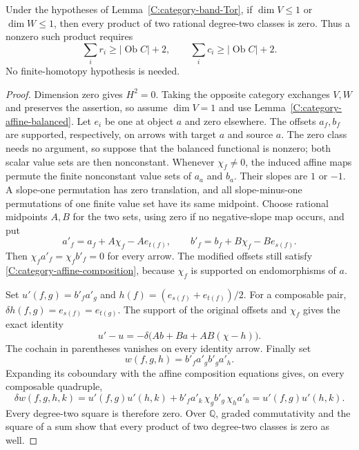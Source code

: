 \begin{proposition}
\label{C:category-rank-one-cups}
Under the hypotheses of Lemma~\ref{C:category-band-Tor}, if
$\dim V\leq1$ or $\dim W\leq1$, then every product of two
rational degree-two classes is zero.  Thus a nonzero such product
requires
\[
 \sum_i r_i\geq |\operatorname{Ob}C|+2,
 \qquad
 \sum_i c_i\geq |\operatorname{Ob}C|+2.
\]
No finite-homotopy hypothesis is needed.
\end{proposition}
\begin{proof}
Dimension zero gives $H^2=0$.  Taking the opposite category
exchanges $V,W$ and preserves the assertion, so assume $\dim V=1$
and use Lemma~\ref{C:category-affine-balanced}.  Let $e_i$ be one
at object $a$ and zero elsewhere.  The offsets $a_f,b_f$ are
supported, respectively, on arrows with target $a$ and source $a$.
The zero class needs no argument, so suppose that the balanced
functional is nonzero; both scalar value sets are then nonconstant.
Whenever $\chi_f\ne0$, the induced affine maps permute the finite
nonconstant value sets of $a_a$ and $b_a$.  Their slopes are
$1$ or $-1$.  A slope-one permutation has zero translation, and
all slope-minus-one permutations of one finite value set have
its same midpoint.  Choose rational midpoints $A,B$ for the two
sets, using zero if no negative-slope map occurs, and put
\[
 a'_f=a_f+A\chi_f-Ae_{t(f)},\qquad
 b'_f=b_f+B\chi_f-Be_{s(f)}.
\]
Then $\chi_fa'_f=\chi_fb'_f=0$ for every arrow.  The modified
offsets still satisfy \eqref{C:category-affine-composition},
because $\chi_f$ is supported on endomorphisms of $a$.

Set $u'(f,g)=b'_fa'_g$ and
$h(f)=(e_{s(f)}+e_{t(f)})/2$.  For a composable pair,
$\delta h(f,g)=e_{s(f)}=e_{t(g)}$.  The support of the original
offsets and $\chi_f$ gives the exact identity
\[
 u'-u=-\delta\bigl(A b+B a+AB(\chi-h)\bigr).
\]
The cochain in parentheses vanishes on every identity arrow.
Finally set
\[
 w(f,g,h)=b'_fa'_gb'_ga'_h.
\]
Expanding its coboundary with the affine composition equations
gives, on every composable quadruple,
\[
 \delta w(f,g,h,k)
 =u'(f,g)u'(h,k)
   +b'_fa'_k\,\chi_g b'_g\,\chi_h a'_h
 =u'(f,g)u'(h,k).
\]
Every degree-two square is therefore zero.  Over $\mathbb Q$,
graded commutativity and the square of a sum show that every
product of two degree-two classes is zero as well.
\end{proof}

